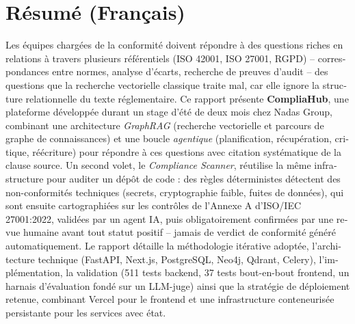 \documentclass[12pt,a4paper]{report}
\begin{document}
\section*{Résumé (Français)}
\begin{otherlanguage}{french}
Les équipes chargées de la conformité doivent répondre à des questions riches
en relations à travers plusieurs référentiels (ISO 42001, ISO 27001, RGPD) --
correspondances entre normes, analyse d'écarts, recherche de preuves d'audit
-- des questions que la recherche vectorielle classique traite mal, car elle
ignore la structure relationnelle du texte réglementaire. Ce rapport présente
\textbf{CompliaHub}, une plateforme développée durant un stage d'été de deux
mois chez Nadas Group, combinant une architecture \emph{GraphRAG} (recherche
vectorielle et parcours de graphe de connaissances) et une boucle
\emph{agentique} (planification, récupération, critique, réécriture) pour
répondre à ces questions avec citation systématique de la clause source.
Un second volet, le \emph{Compliance Scanner}, réutilise la même
infrastructure pour auditer un dépôt de code : des règles déterministes
détectent des non-conformités techniques (secrets, cryptographie faible,
fuites de données), qui sont ensuite cartographiées sur les contrôles de
l'Annexe A d'ISO/IEC 27001:2022, validées par un agent IA, puis obligatoirement
confirmées par une revue humaine avant tout statut positif -- jamais de
verdict de conformité généré automatiquement. Le rapport détaille la
méthodologie itérative adoptée, l'architecture technique (FastAPI, Next.js,
PostgreSQL, Neo4j, Qdrant, Celery), l'implémentation, la validation (511 tests
backend, 37 tests bout-en-bout frontend, un harnais d'évaluation fondé sur un
LLM-juge) ainsi que la stratégie de déploiement retenue, combinant Vercel pour
le frontend et une infrastructure conteneurisée persistante pour les services
avec état.
\end{otherlanguage}
\end{document}
